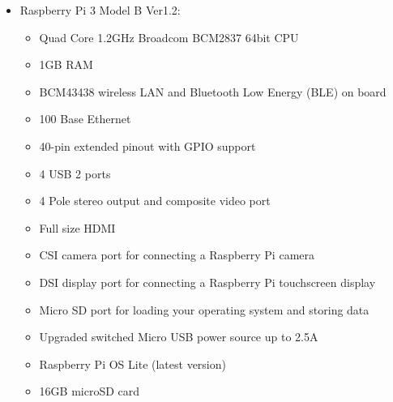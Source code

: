 \documentclass[a4paper,11pt]{scrartcl}
\begin{document}
\begin{itemize}
    \item Raspberry Pi 3 Model B Ver1.2:
    \begin{itemize}
        \item Quad Core 1.2GHz Broadcom BCM2837 64bit CPU
        \item 1GB RAM
        \item BCM43438 wireless LAN and Bluetooth Low Energy (BLE) on board
        \item 100 Base Ethernet
        \item 40-pin extended pinout with GPIO support
        \item 4 USB 2 ports
        \item 4 Pole stereo output and composite video port
        \item Full size HDMI
        \item CSI camera port for connecting a Raspberry Pi camera
        \item DSI display port for connecting a Raspberry Pi touchscreen display
        \item Micro SD port for loading your operating system and storing data
        \item Upgraded switched Micro USB power source up to 2.5A
        \item Raspberry Pi OS Lite (latest version)
        \item 16GB microSD card
    \end{itemize}
\end{itemize}
\end{document}
